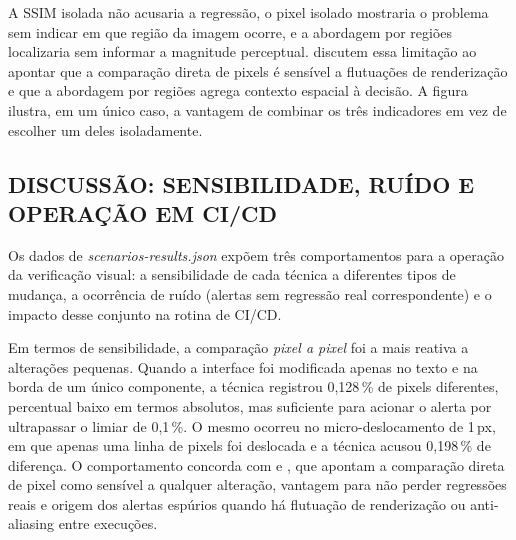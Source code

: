 \documentclass{UNESC}
\begin{document}
A SSIM isolada não acusaria a regressão, o pixel isolado mostraria o problema sem indicar em que região da imagem ocorre, e a abordagem por regiões localizaria sem informar a magnitude perceptual.  discutem essa limitação ao apontar que a comparação direta de pixels é sensível a flutuações de renderização e que a abordagem por regiões agrega contexto espacial à decisão. A figura ilustra, em um único caso, a vantagem de combinar os três indicadores em vez de escolher um deles isoladamente.

\subsection{DISCUSSÃO: SENSIBILIDADE, RUÍDO E OPERAÇÃO EM CI/CD}
Os dados de \emph{scenarios-results.json} expõem três comportamentos para a operação da verificação visual: a sensibilidade de cada técnica a diferentes tipos de mudança, a ocorrência de ruído (alertas sem regressão real correspondente) e o impacto desse conjunto na rotina de CI/CD.

Em termos de sensibilidade, a comparação \emph{pixel a pixel} foi a mais reativa a alterações pequenas. Quando a interface foi modificada apenas no texto e na borda de um único componente, a técnica registrou 0,128\,\% de pixels diferentes, percentual baixo em termos absolutos, mas suficiente para acionar o alerta por ultrapassar o limiar de 0,1\,\%. O mesmo ocorreu no micro-deslocamento de 1\,px, em que apenas uma linha de pixels foi deslocada e a técnica acusou 0,198\,\% de diferença. O comportamento concorda com  e , que apontam a comparação direta de pixel como sensível a qualquer alteração, vantagem para não perder regressões reais e origem dos alertas espúrios quando há flutuação de renderização ou anti-aliasing entre execuções.
\end{document}
